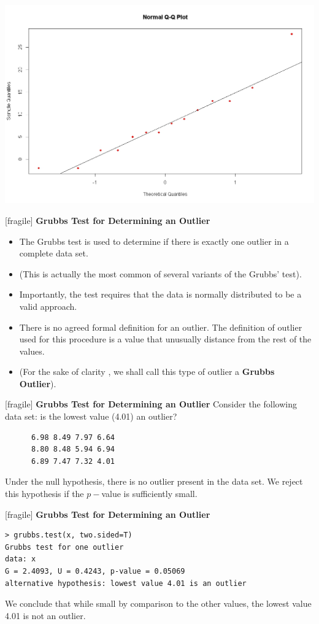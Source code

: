 \documentclass[a4]{beamer}
\begin{document}
\begin{center}
\includegraphics[scale=0.32]{10AQQplot}
\end{center}

[fragile]
\noindent \textbf{Grubbs Test for Determining an Outlier}

\begin{itemize}
\item The Grubbs test is used to determine if there is exactly one outlier in a complete data set.
\item (This is actually the most common of several variants of the Grubbs' test).
\item Importantly, the test requires that the data is normally distributed to be a valid approach.
\item There is no agreed formal definition for an outlier. The definition of outlier used for this procedure is a value that unusually distance from the rest of the values.
\item (For the sake of clarity , we shall call this type of outlier a \textbf{Grubbs Outlier}). 
\end{itemize}


[fragile]
\noindent \textbf{Grubbs Test for Determining an Outlier}
Consider the following data set: is the lowest value (4.01) an outlier?
\begin{verbatim}
      6.98 8.49 7.97 6.64
      8.80 8.48 5.94 6.94
      6.89 7.47 7.32 4.01
\end{verbatim}

Under the null hypothesis, there is no outlier present in the data set. 
We reject this hypothesis if the $p-$value is sufficiently small.


[fragile]
\noindent \textbf{Grubbs Test for Determining an Outlier}
\vspace{-1cm}
\begin{verbatim}
> grubbs.test(x, two.sided=T)
Grubbs test for one outlier
data: x
G = 2.4093, U = 0.4243, p-value = 0.05069
alternative hypothesis: lowest value 4.01 is an outlier
\end{verbatim}
We conclude that while small by comparison to the other values, the lowest value 4.01 is not an outlier.
\end{document}
